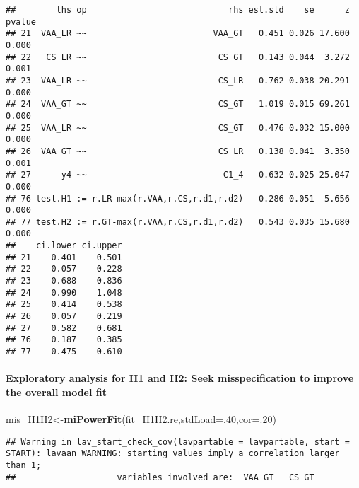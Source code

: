 \documentclass[
]{article}
\newenvironment{Shaded}{\begin{snugshade}}{\end{snugshade}}
\newcommand{\CommentTok}[1]{\textcolor[rgb]{0.56,0.35,0.01}{\textit{#1}}}
\newcommand{\DataTypeTok}[1]{\textcolor[rgb]{0.13,0.29,0.53}{#1}}
\newcommand{\DecValTok}[1]{\textcolor[rgb]{0.00,0.00,0.81}{#1}}
\newcommand{\KeywordTok}[1]{\textcolor[rgb]{0.13,0.29,0.53}{\textbf{#1}}}
\newcommand{\NormalTok}[1]{#1}
\newcommand{\OperatorTok}[1]{\textcolor[rgb]{0.81,0.36,0.00}{\textbf{#1}}}
\newcommand{\StringTok}[1]{\textcolor[rgb]{0.31,0.60,0.02}{#1}}
\begin{document}
\begin{verbatim}
##        lhs op                            rhs est.std    se      z pvalue
## 21  VAA_LR ~~                         VAA_GT   0.451 0.026 17.600  0.000
## 22   CS_LR ~~                          CS_GT   0.143 0.044  3.272  0.001
## 23  VAA_LR ~~                          CS_LR   0.762 0.038 20.291  0.000
## 24  VAA_GT ~~                          CS_GT   1.019 0.015 69.261  0.000
## 25  VAA_LR ~~                          CS_GT   0.476 0.032 15.000  0.000
## 26  VAA_GT ~~                          CS_LR   0.138 0.041  3.350  0.001
## 27      y4 ~~                           C1_4   0.632 0.025 25.047  0.000
## 76 test.H1 := r.LR-max(r.VAA,r.CS,r.d1,r.d2)   0.286 0.051  5.656  0.000
## 77 test.H2 := r.GT-max(r.VAA,r.CS,r.d1,r.d2)   0.543 0.035 15.680  0.000
##    ci.lower ci.upper
## 21    0.401    0.501
## 22    0.057    0.228
## 23    0.688    0.836
## 24    0.990    1.048
## 25    0.414    0.538
## 26    0.057    0.219
## 27    0.582    0.681
## 76    0.187    0.385
## 77    0.475    0.610
\end{verbatim}

\newpage

\hypertarget{exploratory-analysis-for-h1-and-h2-seek-misspecification-to-improve-the-overall-model-fit}{%
\paragraph{Exploratory analysis for H1 and H2: Seek misspecification to
improve the overall model
fit}\label{exploratory-analysis-for-h1-and-h2-seek-misspecification-to-improve-the-overall-model-fit}}

\begin{Shaded}
\begin{Highlighting}[]
\NormalTok{mis_H1H2<-}\KeywordTok{miPowerFit}\NormalTok{(fit_H1H2.re,}\DataTypeTok{stdLoad=}\NormalTok{.}\DecValTok{40}\NormalTok{,}\DataTypeTok{cor=}\NormalTok{.}\DecValTok{20}\NormalTok{)}
\end{Highlighting}
\end{Shaded}

\begin{verbatim}
## Warning in lav_start_check_cov(lavpartable = lavpartable, start = START): lavaan WARNING: starting values imply a correlation larger than 1;
##                    variables involved are:  VAA_GT   CS_GT
\end{verbatim}

\begin{Shaded}
\end{Shaded}
\end{document}
